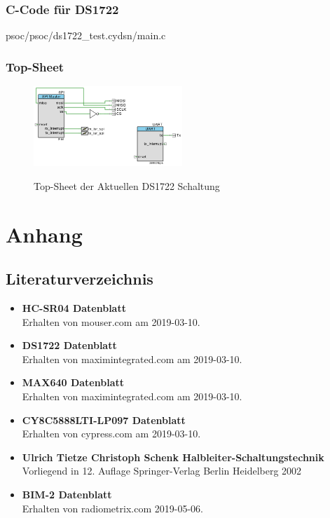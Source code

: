\documentclass[12pt,a4paper,german]{article}
\begin{document}
\subsubsection{C-Code für DS1722}


	{psoc/psoc/ds1722_test.cydsn/main.c}

\subsubsection{Top-Sheet}
	 
 \begin{figure}[H]
	\centering
	\includegraphics[width=0.5\textwidth]{pictures/topsch_ds1722.png}
	\label{fig:topsch_ds1722}
	\caption{Top-Sheet der Aktuellen DS1722 Schaltung}
\end{figure}

\section{Anhang}

\subsection{Literaturverzeichnis}

\begin{itemize}
	
	\item{\textbf{HC-SR04 Datenblatt}}\\
		Erhalten von mouser.com am 2019-03-10.
	\item{\textbf{DS1722 Datenblatt}}\\
		Erhalten von maximintegrated.com am 2019-03-10.
	\item{\textbf{MAX640 Datenblatt}}\\
		Erhalten von maximintegrated.com am 2019-03-10.
	\item{\textbf{CY8C5888LTI-LP097 Datenblatt}}\\
		Erhalten von cypress.com am 2019-03-10.
	\item{\textbf{Ulrich Tietze Christoph Schenk 
		Halbleiter-Schaltungstechnik}}\\
		Vorliegend in 12. Auflage Springer-Verlag Berlin Heidelberg 2002
	\item{\textbf{BIM-2 Datenblatt}}\\
		Erhalten von radiometrix.com 2019-05-06.

\end{itemize}
\end{document}
